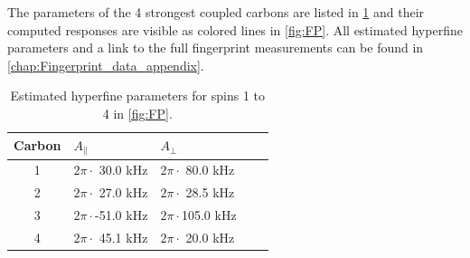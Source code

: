 The parameters of the 4 strongest coupled carbons are listed in \cref{tbl:HF_par} and their computed responses are visible as colored lines in \cref{fig:FP}.
All estimated hyperfine parameters and a link to the full fingerprint measurements can be found in \cref{chap:Fingerprint_data_appendix}.

\begin{table}[htbp]
    \begin{tabular}{cllll}
    Carbon & \quad \quad  $A_{\parallel} $ & \quad \quad $A_{\perp}$ \\ \hline
    1         & $2 \pi \cdot${ }30.0 kHz             & $2 \pi \cdot${ }80.0 kHz                \\
    2         & $2 \pi \cdot${ }27.0 kHz             & $2 \pi \cdot${ }28.5 kHz              \\
    3         & $2 \pi \cdot$-51.0 kHz          & $2 \pi \cdot$105.0 kHz              \\
    4         & $2 \pi \cdot${ }45.1 kHz           & $2 \pi \cdot${ }20.0 kHz                \\
    \end{tabular}
    \caption{Estimated hyperfine parameters for spins 1 to 4 in \cref{fig:FP}.}
    \label{tbl:HF_par}
\end{table}
